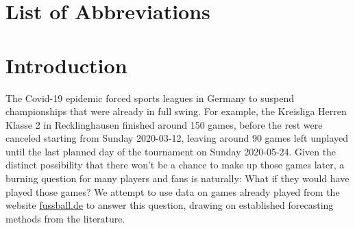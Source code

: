\documentclass[12pt,a4paper]{article}
\begin{document}
\newpage
\listoffigures
{}

\listoftables
{}

\section*{List of Abbreviations}

\begin{adjustwidth}{1.5em}{0pt}

\begin{acronym}[dummyyyy]


\end{acronym}

\end{adjustwidth}

\restoregeometry

\newpage
{}
\hypertarget{introduction}{%
\section{Introduction}\label{introduction}}

The Covid-19 epidemic forced sports leagues in Germany to suspend
championships that were already in full swing. For example, the
Kreisliga Herren Klasse 2 in Recklinghausen finished around 150 games,
before the rest were canceled starting from Sunday 2020-03-12, leaving
around 90 games left unplayed until the last planned day of the
tournament on Sunday 2020-05-24. Given the distinct possibility that
there won't be a chance to make up those games later, a burning question
for many players and fans is naturally: What if they would have played
those games? We attempt to use data on games already played from the
website
\href{http://www.fussball.de/spielplan/re-kl-a-2-kreis-recklinghausen-kreisliga-a-herren-saison1920-westfalen/-/staffel/027II28DS800000DVS5489B3VS3GHJJU-G\#!/section/matchplan}{fussball.de}
to answer this question, drawing on established forecasting methods from
the literature.
\end{document}
